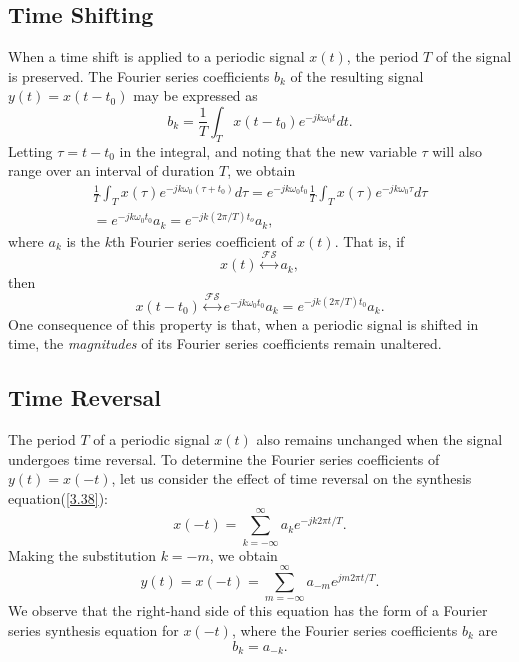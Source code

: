 \documentclass[a4paper,10pt,twoside]{book}
\begin{document}
\subsection{Time Shifting}

When a time shift is applied to a periodic signal $x(t)$, the period $T$ of the signal is preserved. The Fourier series coefficients $b_k$ of the resulting signal $y(t)=x(t-t_0)$ may be expressed as
\begin{equation}
    b_k = \frac{1}{T}\int_Tx(t-t_0)e^{-jk\omega_0t}dt.
    \label{3.59}
\end{equation}
Letting $\tau=t-t_0$ in the integral, and noting that the new variable $\tau$ will also range over an interval of duration $T$, we obtain
\begin{equation}
    \begin{aligned}\frac{1}{T}\int_{T}x(\tau)e^{-jk\omega_{0}(\tau+t_{0})}d\tau=e^{-jk\omega_{0}t_{0}}\frac{1}{T}\int_{T}x(\tau)e^{-jk\omega_{0}\tau}d\tau\\=e^{-jk\omega_{0}t_{0}}a_{k}=e^{-jk(2\pi/T)t_{o}}a_{k},\end{aligned}
    \label{3.60}
\end{equation}
where $a_k$ is the $k$th Fourier series coefficient of $x(t)$. That is, if $$x(t)\overset{\mathcal{FS}}{\longleftrightarrow}a_k,$$ then $$x(t-t_0)\overset{\mathcal{FS}}{\longleftrightarrow}e^{-jk\omega_0t_0}a_k=e^{-jk(2\pi/T)t_0}a_k.$$ One consequence of this property is that, when a periodic signal is shifted in time, the \textit{magnitudes} of its Fourier series coefficients remain unaltered.

\subsection{Time Reversal}

The period $T$ of a periodic signal $x(t)$ also remains unchanged when the signal undergoes time reversal. To determine the Fourier series coefficients of $y(t)=x(-t)$, let us consider the effect of time reversal on the synthesis equation\;(\ref{3.38}):
\begin{equation}
    x(-t) = \sum_{k=-\infty}^{\infty}a_{k}e^{-j k2\pi t/T}.
    \label{3.61}
\end{equation}
Making the substitution $k=-m$, we obtain
\begin{equation}
    y(t) = x(-t) = \sum_{m=-\infty}^{\infty}a_{-m}e^{jm2\pi t/T}.
    \label{3.62}
\end{equation}
We observe that the right-hand side of this equation has the form of a Fourier series synthesis equation for $x(-t)$, where the Fourier series coefficients $b_k$ are
\begin{equation}
    b_k=a_{-k}.
    \label{3.63}
\end{equation}
\end{document}
